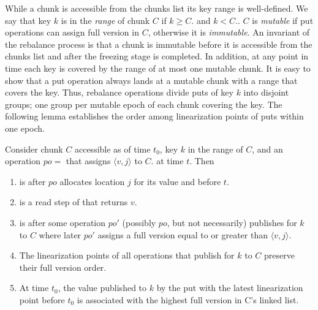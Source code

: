 While a chunk is accessible from the chunks list its key range is well-defined.
We say that key $k$ is in the \emph{range} of chunk $C$ if $k \geq C$. and $k < C.$.
$C$ is \emph{mutable} if put operations can assign full version in $C$, otherwise it is \emph{immutable}.
An invariant of the rebalance process is that 
a chunk is immutable before it is accessible from the chunks list and after the freezing stage is completed. 
In addition, at any point in time each key is covered by the range of at most one mutable chunk. 
It is easy to show that a put operation always lands at a mutable chunk with a range that covers the key.
Thus, rebalance operations divide puts of key $k$ into disjoint groups; one group per mutable epoch of each chunk covering the key.
The following lemma 
establishes the order among linearization points of puts within one epoch.
\begin{lemma}
\label{proof:put}
Consider chunk $C$ accessible as of time $t_0$, key $k$ in the range of $C$, and an
operation $po=$ that assigns $\langle v, j\rangle$ to $C$. at time $t$. Then  
\begin{enumerate}
\setlength{\itemsep}{0pt}
\setlength{\parskip}{0pt}
\item \label{proof:put:lp1}  is after $po$ allocates location $j$ for its value and before $t$.
\item \label{proof:put:lp2}  is a read step of  that returns $v$.
\item \label{proof:put:lp3}  is after some operation $po'$ (possibly $po$, but not necessarily) publishes for $k$ to $C$ where later $po'$ assigns a full version equal to or greater than $\langle v, j\rangle$.
\item \label{proof:put:lp4} The linearization points of all operations that publish for $k$ to $C$ preserve their full version order.
\item \label{proof:put:lp5} At time $t_0$, the value published to $k$ by the put with the latest linearization point before $t_0$ is associated with the highest full version in C's linked list.
\end{enumerate}
\end{lemma}




